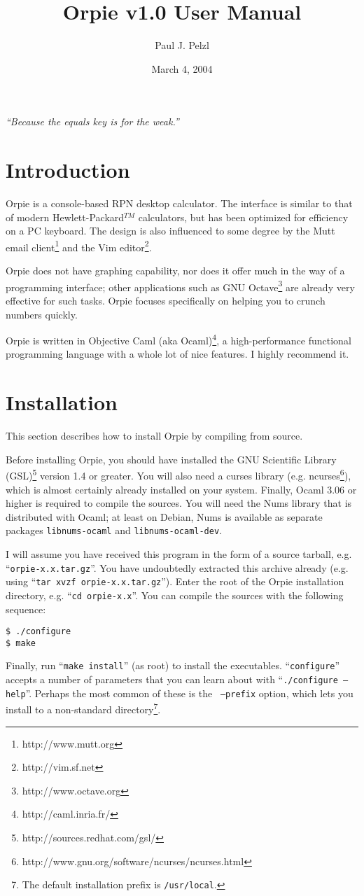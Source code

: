 \documentclass[11pt,notitlepage]{article}
\begin{document}
\title{Orpie v1.0 User Manual}
\author{Paul J. Pelzl}
\date{March 4, 2004}
\maketitle

\begin{center}
{\em ``Because the equals key is for the weak.''}
\end{center}


\section{Introduction}
Orpie is a console-based RPN desktop calculator.  The interface is similar to
that of modern Hewlett-Packard${}^{TM}$ calculators, but has been optimized for
efficiency on a PC keyboard.  The design is also influenced to some degree by 
the Mutt email client\footnote{http://www.mutt.org} and the Vim
editor\footnote{http://vim.sf.net}.

Orpie does not have graphing capability, nor does it offer much in the way of a
programming interface; other applications such as GNU
Octave\footnote{http://www.octave.org} are already very effective for such
tasks.  Orpie focuses specifically on helping you to crunch numbers quickly.

Orpie is written in Objective Caml (aka Ocaml)\footnote{http://caml.inria.fr/}, a
high-performance functional programming language with a whole lot of nice
features.  I highly recommend it.

\section{Installation}
This section describes how to install Orpie by compiling from source.

Before installing Orpie, you should have installed the GNU Scientific Library
(GSL)\footnote{http://sources.redhat.com/gsl/} version 1.4 or greater.  You will
also need a curses library (e.g.
ncurses\footnote{http://www.gnu.org/software/ncurses/ncurses.html}), which is
almost certainly already installed on your system.  Finally, Ocaml 3.06 or
higher is required to compile the sources.  You will need the Nums library that
is distributed with Ocaml; at least on Debian, Nums is available as separate
packages {\tt libnums-ocaml} and {\tt libnums-ocaml-dev}.

I will assume you have received this program in the form of a source tarball, 
e.g. ``{\tt orpie-x.x.tar.gz}''.  You have undoubtedly extracted this archive 
already (e.g. using ``{\tt tar xvzf orpie-x.x.tar.gz}'').  Enter the root of 
the Orpie installation directory, e.g. ``{\tt cd orpie-x.x}''.  You can compile
the sources with the following sequence:
\begin{verbatim}
$ ./configure
$ make
\end{verbatim}
Finally, run ``{\tt make install}'' (as root) to install the executables.
``{\tt configure}'' accepts a number of parameters that you can learn about with
``{\tt ./configure --help}''.  Perhaps the most common of these is the {\tt
--prefix} option, which lets you install to a non-standard
directory\footnote{The default installation prefix is {\tt /usr/local}.}.  
\end{document}
